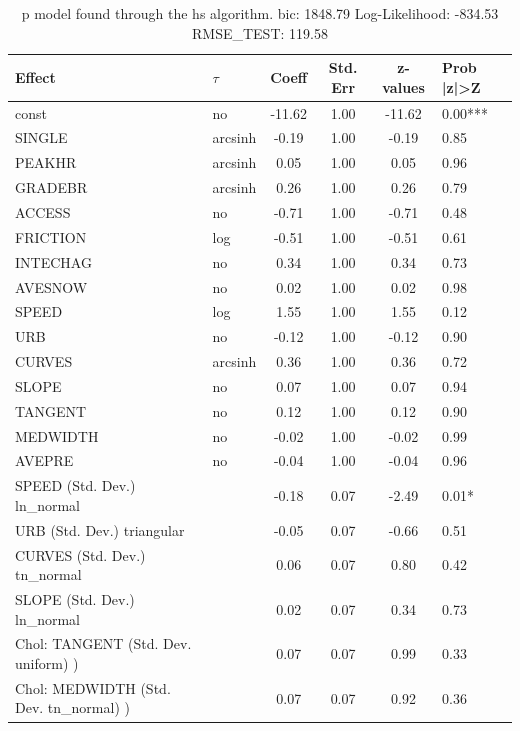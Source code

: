 \begin{table}
	\caption{p model found through the hs algorithm. bic: 1848.79 Log-Likelihood: -834.53 RMSE_TEST: 119.58}
	\begin{center}
		\begin{tabular}{|l|l|c|c|c|l|}
			\hline
			Effect & $\tau$ & Coeff & Std. Err & z-values & Prob |z|>Z \\
			\hline
			const & no & -11.62 & 1.00 & -11.62 & 0.00*** \\
			\hline
			SINGLE & arcsinh & -0.19 & 1.00 & -0.19 & 0.85 \\
			\hline
			PEAKHR & arcsinh & 0.05 & 1.00 & 0.05 & 0.96 \\
			\hline
			GRADEBR & arcsinh & 0.26 & 1.00 & 0.26 & 0.79 \\
			\hline
			ACCESS & no & -0.71 & 1.00 & -0.71 & 0.48 \\
			\hline
			FRICTION & log & -0.51 & 1.00 & -0.51 & 0.61 \\
			\hline
			INTECHAG & no & 0.34 & 1.00 & 0.34 & 0.73 \\
			\hline
			AVESNOW & no & 0.02 & 1.00 & 0.02 & 0.98 \\
			\hline
			SPEED & log & 1.55 & 1.00 & 1.55 & 0.12 \\
			\hline
			URB & no & -0.12 & 1.00 & -0.12 & 0.90 \\
			\hline
			CURVES & arcsinh & 0.36 & 1.00 & 0.36 & 0.72 \\
			\hline
			SLOPE & no & 0.07 & 1.00 & 0.07 & 0.94 \\
			\hline
			TANGENT & no & 0.12 & 1.00 & 0.12 & 0.90 \\
			\hline
			MEDWIDTH & no & -0.02 & 1.00 & -0.02 & 0.99 \\
			\hline
			AVEPRE & no & -0.04 & 1.00 & -0.04 & 0.96 \\
			\hline
			SPEED (Std. Dev.) ln_normal &  & -0.18 & 0.07 & -2.49 & 0.01* \\
			\hline
			URB (Std. Dev.) triangular &  & -0.05 & 0.07 & -0.66 & 0.51 \\
			\hline
			CURVES (Std. Dev.) tn_normal &  & 0.06 & 0.07 & 0.80 & 0.42 \\
			\hline
			SLOPE (Std. Dev.) ln_normal &  & 0.02 & 0.07 & 0.34 & 0.73 \\
			\hline
			 Chol: TANGENT (Std. Dev. uniform) ) &  & 0.07 & 0.07 & 0.99 & 0.33 \\
			\hline
			 Chol: MEDWIDTH (Std. Dev. tn_normal) ) &  & 0.07 & 0.07 & 0.92 & 0.36 \\

\end{tabular}
\end{center}
\end{table}
